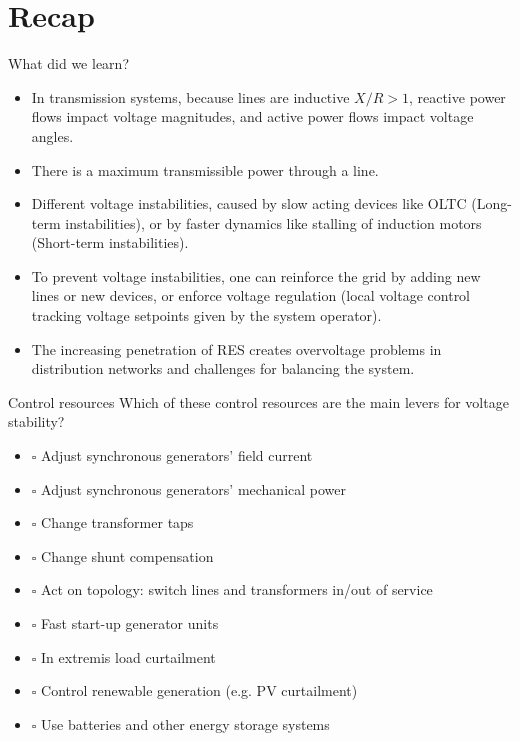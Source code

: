\section{Recap}
\begin{frame}{What did we learn?}
\begin{itemize}
    \item In transmission systems, because lines are inductive $X/R > 1$, reactive power flows impact voltage magnitudes, and active power flows impact voltage angles.
    \item There is a maximum transmissible power through a line.
    \item Different voltage instabilities, caused by slow acting devices like OLTC (Long-term instabilities), or by faster dynamics like stalling of induction motors (Short-term instabilities).
    \item To prevent voltage instabilities, one can reinforce the grid by adding new lines or new devices, or enforce voltage regulation (local voltage control tracking voltage setpoints given by the system operator).
    \item The increasing penetration of RES creates overvoltage problems in distribution networks and challenges for balancing the system.
\end{itemize}
\end{frame}

\begin{frame}{Control resources}
    Which of these control resources are the main levers for voltage stability?
      \begin{itemize}
          \item $\square$ Adjust synchronous generators' field current %
          \item $\square$ Adjust synchronous generators' mechanical power 
          \item $\square$ Change transformer taps %
          \item $\square$ Change shunt compensation %
          \item $\square$ Act on topology: switch lines and transformers in/out of service %
          \item $\square$ Fast start-up generator units %
          \item $\square$ In extremis load curtailment %
          \item $\square$ Control renewable generation (e.g. PV curtailment) %
          \item $\square$ Use batteries and other energy storage systems %
      \end{itemize}
\end{frame}

